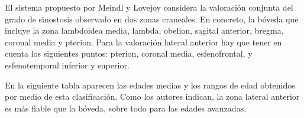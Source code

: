 \documentclass[a4paper,11pt]{article}
\begin{document}
El sistema propuesto por Meindl y Lovejoy considera la valoración conjunta del grado de sinostosis observado en dos zonas craneales. En concreto, la bóveda que incluye la zona lambdoidea media, lambda, obelion, sagital anterior, bregma, coronal media y pterion.
\newpage
Para la valoración lateral anterior hay que tener en cuenta los siguientes puntos: pterion, coronal media, esfenofrontal, y esfenotemporal inferior y superior.

En la siguiente tabla aparecen las edades medias y los rangos de edad obtenidos por medio de esta clasificación. Como los autores indican, la zona lateral anterior es más fiable que la bóveda, sobre todo para las edades avanzadas.
\begin{center}
\end{center}
\end{document}
